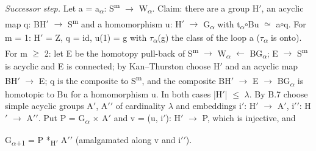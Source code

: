 \emph{Successor step.} Let a = a\textsubscript{\ensuremath{\alpha}}: S\textsuperscript{m} \ensuremath{\to} W\textsubscript{\ensuremath{\alpha}}. Claim: there are a group H\ensuremath{\prime}, an acyclic map q: BH\ensuremath{\prime} \ensuremath{\to} S\textsuperscript{m} and a homomorphism u: H\ensuremath{\prime} \ensuremath{\to} G\textsubscript{\ensuremath{\alpha}} with t\textsubscript{\ensuremath{\alpha}}\ensuremath{\circ}Bu \ensuremath{\simeq} a\ensuremath{\circ}q. For m = 1: H\ensuremath{\prime} = Z, q = id, u(1) = g with \ensuremath{\tau}\textsubscript{\ensuremath{\alpha}}(g) the class of the loop a (\ensuremath{\tau}\textsubscript{\ensuremath{\alpha}} is onto). For m \ensuremath{\geq} 2: let E be the homotopy pull-back of S\textsuperscript{m} \ensuremath{\to} W\textsubscript{\ensuremath{\alpha}} \ensuremath{\leftarrow} BG\textsubscript{\ensuremath{\alpha}}; E \ensuremath{\to} S\textsuperscript{m} is acyclic and E is connected; by Kan--Thurston choose H\ensuremath{\prime} and an acyclic map BH\ensuremath{\prime} \ensuremath{\to} E; q is the composite to S\textsuperscript{m}, and the composite BH\ensuremath{\prime} \ensuremath{\to} E \ensuremath{\to} BG\textsubscript{\ensuremath{\alpha}} is homotopic to Bu for a homomorphism u. In both cases |H\ensuremath{\prime}| \ensuremath{\leq} \ensuremath{\lambda}. By B.7 choose simple acyclic groups A\ensuremath{\prime}, A\ensuremath{\prime\prime} of cardinality \ensuremath{\lambda} and embeddings i\ensuremath{\prime}: H\ensuremath{\prime} \ensuremath{\to} A\ensuremath{\prime}, i\ensuremath{\prime\prime}: H\ensuremath{\prime} \ensuremath{\to} A\ensuremath{\prime\prime}. Put P = G\textsubscript{\ensuremath{\alpha}} \ensuremath{\times} A\ensuremath{\prime} and v = (u, i\ensuremath{\prime}): H\ensuremath{\prime} \ensuremath{\to} P, which is injective, and

  G\textsubscript{\ensuremath{\alpha}+1} = P *\textsubscript{H\ensuremath{\prime}} A\ensuremath{\prime\prime}  (amalgamated along v and i\ensuremath{\prime\prime}).

